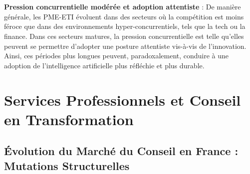 \\\\
\textbf{Pression concurrentielle modérée et adoption attentiste} : De manière générale, les PME-ETI évoluent dans des secteurs où la compétition est moins féroce que dans des environnements hyper-concurrentiels, tels que la tech ou la finance. Dans ces secteurs matures, la pression concurrentielle est telle qu'elles peuvent se permettre d'adopter une posture attentiste vis-à-vis de l'innovation. Ainsi, ces périodes plus longues peuvent, paradoxalement, conduire à une adoption de l'intelligence artificielle plus réfléchie et plus durable.

\section{Services Professionnels et Conseil en Transformation}

\subsection{Évolution du Marché du Conseil en France : Mutations Structurelles}

